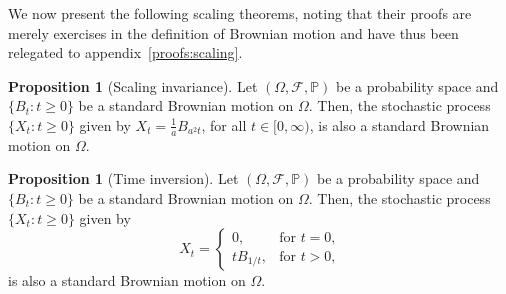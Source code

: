 \documentclass[a4paper,11pt]{article}
\theoremstyle{plain}
\theoremstyle{definition}
\newtheorem{proposition}[theorem]{Proposition}
\begin{document}
We now present the following scaling theorems, noting that their proofs are merely exercises in the definition of Brownian motion and have thus been relegated to appendix~\ref{proofs:scaling}.

\begin{proposition}[Scaling invariance]\label{prop:scalinv}
\citep[p.~12]{M&P} Let $(\Omega, \mathcal{F}, \mathbb{P})$ be a probability space and $\{B_t:t \geq 0\}$ be a standard Brownian motion on $\Omega$. Then, the stochastic process $\{X_t:t \geq 0\}$ given by $X_t = \frac{1}{a} B_{a^2t}$, for all $t \in [0,\infty)$, is also a standard Brownian motion on $\Omega$.
\end{proposition}





\begin{proposition}[Time inversion]\label{prop:timeinv}
\citep[p.~13]{M&P} Let $(\Omega, \mathcal{F}, \mathbb{P})$ be a probability space and $\{B_t:t \geq 0\}$ be a standard Brownian motion on $\Omega$. Then, the stochastic process $\{X_t:t \geq 0\}$ given by
\[
X_t = 
\begin{cases}
  0, & \text{for $t = 0$,} \\
  tB_{1/t}, & \text{for $t > 0$,}
\end{cases}
\]
is also a standard Brownian motion on $\Omega$.
\end{proposition}
\end{document}
